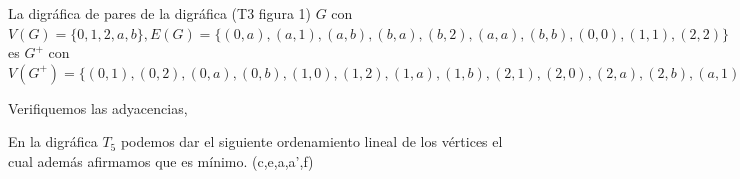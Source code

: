  La digráfica de pares de la digráfica (T3 figura 1) $G$ con $V(G)= \{0,1,2,a,b\}, E(G)=\{ (0,a),(a,1),(a,b),(b,a),(b,2),(a,a),(b,b),(0,0),(1,1),(2,2)\}$ es $G^+$ con $V(G^+)= \{(0,1), (0,2), (0,a), (0,b), 
 (1,0), (1,2), (1,a), (1,b),
 (2,1), (2,0), (2,a), (2,b),
 (a,1), (a,2), (a,3), (a,b), 
 (b,1), (b,2), (b,3), (b,a) \}$

 Verifiquemos las adyacencias, 

 En la digráfica $T_5$ podemos dar el siguiente ordenamiento lineal de los vértices el cual además afirmamos que es mínimo. (c,e,a,a',f)
